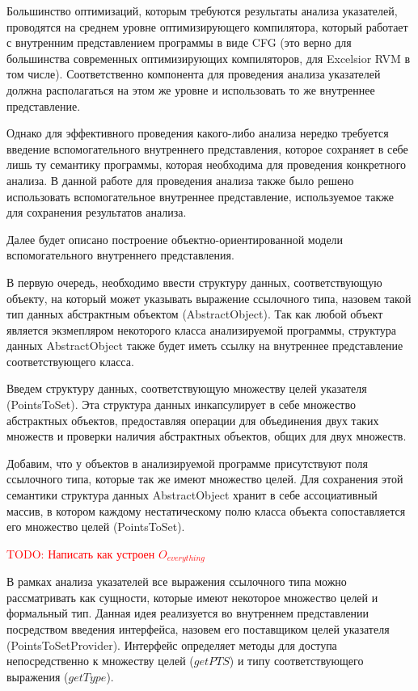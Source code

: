 \documentclass[14pt,titlepage]{extarticle}
\newcommand{\todo}[1]{\textcolor{red}{\eng{TODO}: #1}}
\newcommand{\eng}[1]{{\English#1}}
\begin{document}
    Большинство оптимизаций, которым требуются результаты анализа указателей,
    проводятся на среднем уровне оптимизирующего компилятора, который
    работает с внутренним представлением программы в виде CFG (это верно для
    большинства современных оптимизирующих компиляторов, для \eng{Excelsior}
    RVM в том числе). Соответственно компонента для проведения анализа
    указателей должна располагаться на этом же уровне и использовать то же
    внутреннее представление.

    Однако для эффективного проведения какого-либо анализа нередко требуется
    введение вспомогательного внутреннего представления, которое сохраняет в
    себе лишь ту семантику программы, которая необходима для проведения
    конкретного анализа. В данной работе для проведения анализа также было
    решено использовать вспомогательное внутреннее представление, используемое
    также для сохранения результатов анализа.

    Далее будет описано построение объектно-ориентированной модели
    вспомогательного внутреннего представления.

    В первую очередь, необходимо ввести структуру данных, соответствующую
    объекту, на который может указывать выражение ссылочного типа, назовем
    такой тип данных абстрактным объектом (\eng{AbstractObject}). Так как любой
    объект является экзмепляром некоторого класса анализируемой программы,
    структура данных \eng{AbstractObject} также будет иметь ссылку на
    внутреннее представление соответствующего класса.

    Введем структуру данных, соответствующую множеству целей указателя
    (\eng{Points\-To\-Set}). Эта структура данных инкапсулирует в себе
    множество абстрактных объектов, предоставляя операции для объединения двух
    таких множеств и проверки наличия абстрактных объектов, общих для двух
    множеств.

    Добавим, что у объектов в анализируемой программе присутствуют поля
    ссылочного типа, которые так же имеют множество целей. Для сохранения
    этой семантики структура данных \eng{AbstractObject} хранит в себе
    ассоциативный массив, в котором каждому нестатическому полю класса объекта
    сопоставляется его множество целей (\eng{PointsToSet}).

    \todo{Написать как устроен $O_{everything}$}

    В рамках анализа указателей все выражения ссылочного типа можно
    рассматривать как сущности, которые имеют некоторое множество целей и
    формальный тип.
    Данная идея реализуется во внутреннем представлении посредством введения
    интерфейса, назовем его поставщиком целей указателя
    (\eng{PointsToSetProvider}).
    Интерфейс определяет методы для доступа непосредственно к множеству целей
    ($getPTS$) и типу соответствующего выражения ($getType$).
\end{document}
